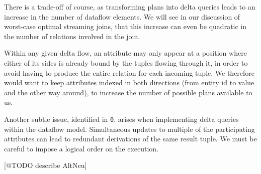 \documentclass[../catalog.tex]{subfiles}
\begin{document}
There is a trade-off of course, as transforming plans into delta
queries leads to an increase in the number of dataflow elements. We
will see in our discussion of worst-case optimal streaming joins, that
this increase can even be quadratic in the number of relations
involved in the join.

Within any given delta flow, an attribute may only appear at a
position where either of its sides is already bound by the tuples
flowing through it, in order to avoid having to produce the entire
relation for each incoming tuple. We therefore would want to keep
attributes indexed in both directions (from entity id to value and the
other way around), to increase the number of possible plans available
to us.

Another subtle issue, identified in \texttt{0}, arises when implementing
delta queries within the dataflow model. Simultaneous updates to
multiple of the participating attributes can lead to redundant
derivations of the same result tuple. We must be careful to impose a
logical order on the execution.

[@TODO describe AltNeu]
\end{document}
